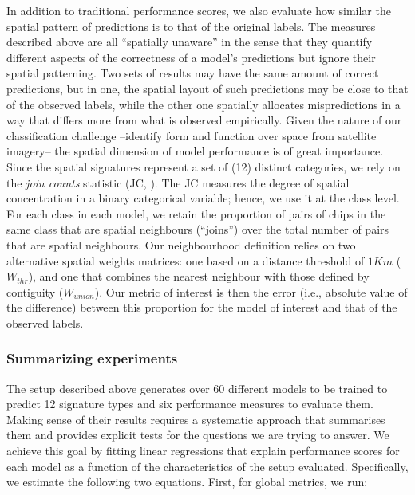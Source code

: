 In addition to traditional performance scores, we also evaluate how similar
the spatial pattern of predictions is to that of the original labels.
The measures described above are all ``spatially unaware'' in the sense that
they quantify different aspects of the correctness of a model's
predictions but ignore their spatial patterning. Two
sets of results may have the same amount of correct predictions, but in one,
the spatial layout of such predictions may be close to
that of the observed labels, while the other one spatially allocates mispredictions in
a way that differs more from what is observed empirically. Given the nature of
our classification challenge --identify form and
function over space from satellite imagery-- the spatial dimension of model
performance is of great importance. Since the spatial signatures represent a
set of (12) distinct categories, we rely on the \textit{join counts} statistic
(JC, \citealp{cliff1981spatial}). The JC measures the degree of spatial
concentration in a binary categorical variable; hence, we use it at the class
level. For each class in each model, we retain the proportion of pairs of
chips in the same class that are spatial neighbours (``joins'') over the total number of
pairs that are spatial neighbours.
Our neighbourhood definition relies on two alternative spatial weights matrices:
one based on a distance threshold of $1Km$ ($W_{thr}$), and one that combines
the nearest neighbour with those defined by contiguity ($W_{union}$).
Our metric of interest is then the error (i.e., absolute
value of the difference) between this proportion for the model of interest and
that of the observed labels.

\subsubsection{Summarizing experiments}


The setup described above generates over 60 different
models to be trained to predict 12 signature types and six performance measures
to evaluate them. Making sense of their results requires a
systematic approach that summarises them and provides explicit tests for the
questions we are trying to answer. We achieve this goal by fitting linear
regressions that explain performance scores for each model as a function
of the characteristics of the setup evaluated. Specifically, we estimate the
following two equations. First, for global metrics, we run:


